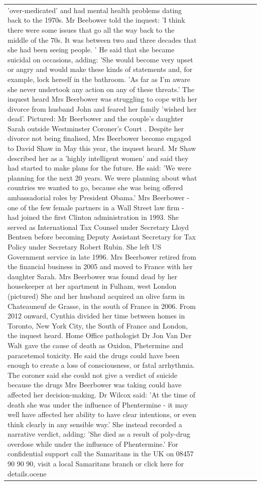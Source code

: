 \begin{table}[H]
\begin{tabular}{lllrlllll}
'over-medicated' and had mental health problems dating back to the 1970s. Mr Beebower told the inquest: 'I think there were some issues that go all the way back to the middle of the 70s. It was between two and three decades that she had been seeing people. ' He said that she became suicidal on occasions, adding: 'She would become very upset or angry and would make these kinds of statements and, for example, lock herself in the bathroom. 'As far as I'm aware she never undertook any action on any of these threats.' The inquest heard Mrs Beerbower was struggling to cope with her divorce from husband John and feared her family 'wished her dead'. Pictured: Mr Beerbower and the couple's daughter Sarah outside Westminster Coroner's Court . Despite her divorce not being finalised, Mrs Beerbower become engaged to David Shaw in May this year, the inquest heard. Mr Shaw described her as a 'highly intelligent women' and said they had started to make plans for the future. He said: 'We were planning for the next 20 years. We were planning about what countries we wanted to go, because she was being offered ambassadorial roles by President Obama.' Mrs Beerbower - one of the few female partners in a Wall Street law firm - had joined the first Clinton administration in 1993. She served as International Tax Counsel under Secretary Lloyd Bentsen before becoming Deputy Assistant Secretary for Tax Policy under Secretary Robert Rubin. She left US Government service in late 1996. Mrs Beerbower retired from the financial business in 2005 and moved to France with her daughter Sarah. Mrs Beerbower was found dead by her housekeeper at her apartment in Fulham, west London (pictured) She and her husband acquired an olive farm in Chateauneuf de Grasse, in the south of France in 2006. From 2012 onward, Cynthia divided her time between homes in Toronto, New York City, the South of France and London, the inquest heard. Home Office pathologist Dr Jon Van Der Walt gave the cause of death as Oxidon, Phetermine and paracetemol toxicity. He said the drugs could have been enough to create a loss of consciousness, or fatal arrhythmia. The coroner said she could not give a verdict of suicide because the drugs Mrs Beerbower was taking could have affected her decision-making. Dr Wilcox said: 'At the time of death she was under the influence of Phentermine - it may well have affected her ability to have clear intentions, or even think clearly in any sensible way.' She instead recorded a narrative verdict, adding: 'She died as a result of poly-drug overdose while under the influence of Phentermine.' For confidential support call the Samaritans in the UK on 08457 90 90 90, visit a local Samaritans branch or click here for details.ocene \\

\end{tabular}
\end{table}
